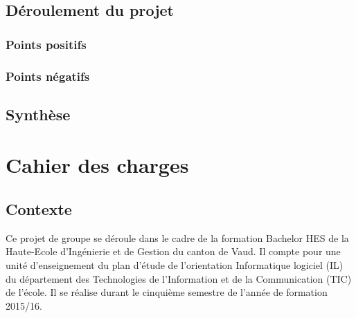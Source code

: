 \documentclass[11pt,a4paper,oldfontcommands]{memoir}
\begin{document}
\section{Déroulement du projet}

\subsection{Points positifs}

\subsection{Points négatifs}

\section{Synthèse}


\lstlistoflistings


\appendix


\chapter{Cahier des charges}

\section{Contexte}

Ce projet de groupe se déroule dans le cadre de la formation Bachelor HES de la Haute-Ecole d'Ingénierie et de Gestion du canton de Vaud. Il compte pour une unité d'enseignement du plan d'étude de l'orientation Informatique logiciel (IL) du département des Technologies de l'Information et de la Communication (TIC) de l'école. Il se réalise durant le cinquième semestre de l'année de formation 2015/16.
\end{document}
